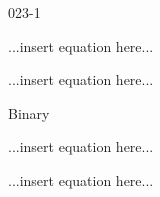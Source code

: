 \begin{mitframe}{023-1}
\begin{listone}
\begin{listtwo}
        \item ...insert equation here...
        
        \item ...insert equation here...
        
        \item Binary
        
        \begin{listthree}
		
        	\item ...insert equation here...
            
            \item ...insert equation here...
	
    	\end{listthree}
	
    \end{listtwo}
                   
\end{listone}			

\end{mitframe}